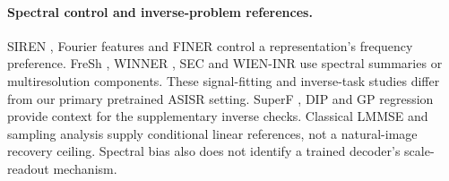 \paragraph{Spectral control and inverse-problem references.}
SIREN \citep{sitzmann2020siren}, Fourier features
\citep{tancik2020fourier,jacot2018ntk} and FINER \citep{liu2024finer}
control a representation's frequency preference. FreSh
\citep{kania2025fresh}, WINNER \citep{winner2025}, SEC \citep{sec2026}
and WIEN-INR \citep{wieninr} use spectral summaries or multiresolution
components. These signal-fitting and inverse-task studies differ from
our primary pretrained ASISR setting. SuperF \citep{superf2026}, DIP
\citep{ulyanov2018dip} and GP regression \citep{rasmussen2006gp} provide
context for the supplementary inverse checks. Classical LMMSE and
sampling analysis \citep{kay1993estimation} supply conditional linear
references, not a natural-image recovery ceiling. Spectral bias
\citep{rahaman2019spectral} also does not identify a trained decoder's
scale-readout mechanism.
